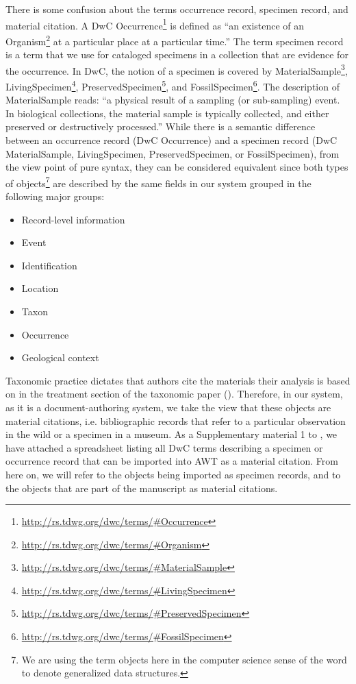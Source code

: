 There is some confusion about the terms occurrence record, specimen record, and material citation. A DwC Occurrence\footnote{\url{http://rs.tdwg.org/dwc/terms/\#Occurrence}} is defined as ``an existence of an Organism\footnote{\url{http://rs.tdwg.org/dwc/terms/\#Organism}} at a particular place at a particular time.'' The term specimen record is a term that we use for cataloged specimens in a collection that are evidence for the occurrence. In DwC, the notion of a specimen is covered by MaterialSample\footnote{\url{http://rs.tdwg.org/dwc/terms/\#MaterialSample}}, LivingSpecimen\footnote{\url{http://rs.tdwg.org/dwc/terms/\#LivingSpecimen}}, PreservedSpecimen\footnote{\url{http://rs.tdwg.org/dwc/terms/\#PreservedSpecimen}}, and FossilSpecimen\footnote{\url{http://rs.tdwg.org/dwc/terms/\#FossilSpecimen}}. The description of MaterialSample reads: ``a physical result of a sampling (or sub-sampling) event. In biological collections, the material sample is typically collected, and either preserved or destructively processed.'' While there is a semantic difference between an occurrence record (DwC Occurrence) and a specimen record (DwC MaterialSample, LivingSpecimen, PreservedSpecimen, or FossilSpecimen), from the view point of pure syntax, they can be considered equivalent since both types of objects\footnote{We are using the term objects here in the computer science sense of the word to denote generalized data structures.} are described by the same fields in our system grouped in the following major groups:

\begin{itemize}
\item{Record-level information}
\item{Event}
\item{Identification}
\item{Location}
\item{Taxon}
\item{Occurrence}
\item{Geological context}
\end{itemize}

Taxonomic practice dictates that authors cite the materials their analysis is based on in the treatment section of the taxonomic paper (\cite{catapano_taxpub:_2010}). Therefore, in our system, as it is a document-authoring system, we take the view that these objects are material citations, i.e. bibliographic records that refer to a particular observation in the wild or a specimen in a museum. As a Supplementary material 1 to \cite{senderov_online_2016}, we have attached a spreadsheet listing all DwC terms describing a specimen or occurrence record that can be imported into AWT as a material citation. From here on, we will refer to the objects being imported as specimen records, and to the objects that are part of the manuscript as material citations.

